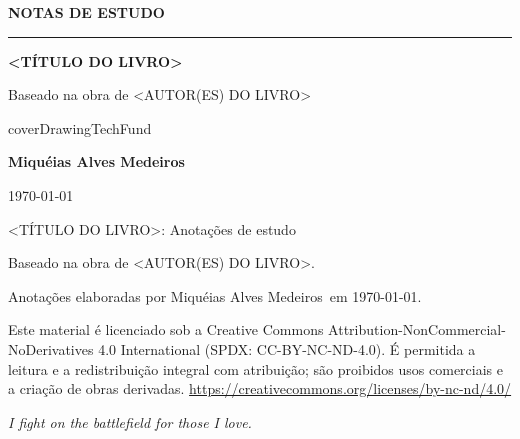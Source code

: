 \documentclass[12pt,a4paper]{article}
\newcommand{\coverserif}{\rmfamily}
\newcommand{\bookTitle}{<TÍTULO DO LIVRO>}
\newcommand{\bookAuthor}{<AUTOR(ES) DO LIVRO>}
\newcommand{\studentName}{Miquéias Alves Medeiros}
\newcommand{\coverArea}{TechFund}
\newcommand{\documentLicense}{Este material é licenciado sob a Creative Commons Attribution-NonCommercial-NoDerivatives 4.0 International (SPDX: CC-BY-NC-ND-4.0). É permitida a leitura e a redistribuição integral com atribuição; são proibidos usos comerciais e a criação de obras derivadas. \url{https://creativecommons.org/licenses/by-nc-nd/4.0/}}
\newcommand{\coverDrawing}{\csname coverDrawing\coverArea\endcsname}
\begin{document}
\begin{titlepage}
	\thispagestyle{empty}
	\centering
	\coverserif
	\vspace*{1.5cm}

	{\small\bfseries\color{coverdim}\MakeUppercase{Notas de estudo}\par}
	\vspace{0.4cm}
	{\color{coverfg}\rule{2cm}{0.6pt}\par}
	\vspace{1.0cm}

	{\bfseries\fontsize{24}{30}\selectfont\color{coverfg} \bookTitle\par}
	\vspace{0.8cm}
	{\normalsize\color{coverdim} Baseado na obra de \bookAuthor\par}

	\vfill

	\coverDrawing

	\vfill

	{\large\bfseries\color{coverfg} \studentName\par}
	\vspace{0.3cm}
	{\small\color{coverdim} \today\par}
	\vspace*{1cm}
\end{titlepage}

\thispagestyle{empty}
\vspace*{\fill}
\begin{flushleft}
	\footnotesize
	\bookTitle: Anotações de estudo\par
	\smallskip
	Baseado na obra de \bookAuthor.
	\par
	\smallskip
	Anotações elaboradas por \studentName\ em \today.
	\par
	\smallskip
	\documentLicense
\end{flushleft}
\newpage

\thispagestyle{empty}
\vspace*{\fill}
\begin{flushright}
	\itshape I fight on the battlefield for those I love.
\end{flushright}
\vspace*{\fill}
\newpage
\end{document}
